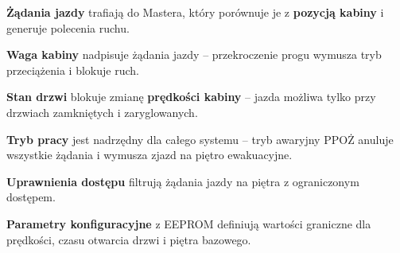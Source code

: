 \documentclass[12pt,a4paper]{article}
\begin{document}
\textbf{Żądania jazdy} trafiają do Mastera, który porównuje je z \textbf{pozycją kabiny} i generuje polecenia ruchu.

\textbf{Waga kabiny} nadpisuje żądania jazdy -- przekroczenie progu wymusza tryb przeciążenia i blokuje ruch.

\textbf{Stan drzwi} blokuje zmianę \textbf{prędkości kabiny} -- jazda możliwa tylko przy drzwiach zamkniętych i zaryglowanych.

\textbf{Tryb pracy} jest nadrzędny dla całego systemu -- tryb awaryjny PPOŻ anuluje wszystkie żądania i wymusza zjazd na piętro ewakuacyjne.

\textbf{Uprawnienia dostępu} filtrują żądania jazdy na piętra z ograniczonym dostępem.

\textbf{Parametry konfiguracyjne} z EEPROM definiują wartości graniczne dla prędkości, czasu otwarcia drzwi i piętra bazowego.
\end{document}
